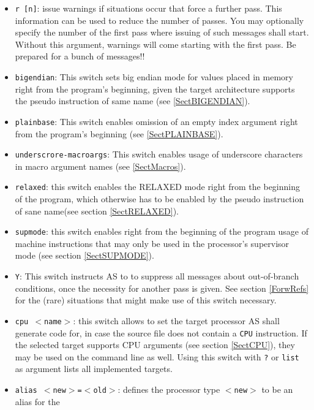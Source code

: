 \documentclass[12pt,twoside]{report}
\newcommand{\tty}[1]{{\tt #1}}
\newcommand{\asname}{{AS}}
\begin{document}
\begin{itemize}
{      used in conjunction with the \tty{P} switch, if only the macro
      processor of \asname{} shall be used.}
\item{\tty{r [n]}: issue warnings if situations occur that force a further
      pass. This information can be used to reduce the number of
      passes.  You may optionally specify the number of the
      first pass where issuing of such messages shall start.
      Without this argument, warnings will come starting with
      the first pass.  Be prepared for a bunch of messages!!}
\item{\tty{bigendian}: This switch sets big endian mode for values placed
      in memory right from the program's beginning, given the target
      architecture supports the pseudo instruction of same name (see
      \ref{SectBIGENDIAN}).}
\item{\tty{plainbase}: This switch enables omission of an empty index
      argument right from the program's beginning (see \ref{SectPLAINBASE}).}
\item{\tty{underscrore-macroargs}: This switch enables usage of underscore characters
      in macro argument names (see \ref{SectMacros}).}
\item{\tty{relaxed}: this switch enables the RELAXED mode right from the
      beginning of the program, which otherwise has to be enabled by the
      pseudo instruction of sane name(see section \ref{SectRELAXED}).}
\item{\tty{supmode}: this switch enables right from the beginning of the
      program usage of machine instructions that may only be used in the
      processor's supervisor mode (see section \ref{SectSUPMODE}).}
\item{\tty{Y}: This switch instructs \asname{} to to suppress all messages about
      out-of-branch conditions, once the necessity for another pass is given.
      See section \ref{ForwRefs} for the (rare) situations that might make
      use of this switch necessary.}
\item{\tty{cpu $<$name$>$}: this switch allows to set the target processor
      \asname{} shall generate code for, in case the source file does not contain
      a {\tt CPU} instruction.  If the selected target
      supports CPU arguments (see section \ref{SectCPU}), they may be used
      on the command line as well.  Using this switch with \verb!?! or {\tt list}
      as argument lists all implemented targets.}
\item{\tty{alias $<$new$>$=$<$old$>$}:
      defines the processor type \tty{$<$new$>$} to be an alias for the
}
\end{itemize}
\end{document}
